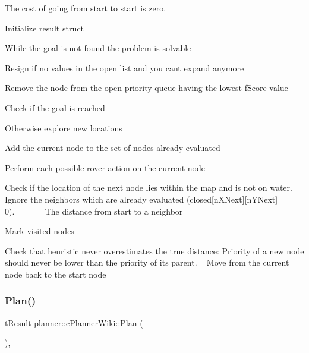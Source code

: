 The cost of going from start to start is zero.

Initialize result struct

While the goal is not found the problem is solvable

Resign if no values in the open list and you can\textquotesingle{}t expand anymore

Remove the node from the open priority queue having the lowest f\+Score value

Check if the goal is reached

Otherwise explore new locations

Add the current node to the set of nodes already evaluated

Perform each possible rover action on the current node

Check if the location of the next node lies within the map and is not on water. Ignore the neighbors which are already evaluated (closed\mbox{[}n\+X\+Next\mbox{]}\mbox{[}n\+Y\+Next\mbox{]} == 0). ~\newline
~\newline
~\newline
~\newline
 The distance from start to a neighbor

Mark visited nodes

Check that heuristic never overestimates the true distance\+: Priority of a new node should never be lower than the priority of its parent. ~\newline
 Move from the current node back to the start node \mbox{\label{classplanner_1_1c_planner_wiki_a9d18be721400b51162ff463ab11d1721}} 
\subsubsection{\texorpdfstring{Plan()}{Plan()}\hspace{0.1cm}{\footnotesize\ttfamily [1/2]}}
{\footnotesize\ttfamily \mbox{\hyperlink{structt_result}{t\+Result}} planner\+::c\+Planner\+Wiki\+::\+Plan (\begin{DoxyParamCaption}{ }\end{DoxyParamCaption})\hspace{0.3cm}{\ttfamily [override]}, {\ttfamily [virtual]}}




